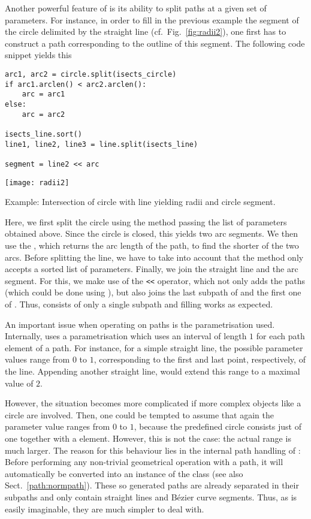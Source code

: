 Another powerful feature of \PyX{} is its ability to split paths at a
given set of parameters. For instance, in order to fill in the
previous example the segment of the circle delimited by the straight
line (cf.\ Fig.~\ref{fig:radii2}), one first has to construct a path
corresponding to the outline of this segment. The following code
snippet yields this 
\begin{verbatim}
arc1, arc2 = circle.split(isects_circle)
if arc1.arclen() < arc2.arclen():
    arc = arc1
else:
    arc = arc2

isects_line.sort()
line1, line2, line3 = line.split(isects_line)

segment = line2 << arc
\end{verbatim}
\texttt{[image: radii2]}
\centerline{Example: Intersection of circle with line yielding radii and
  circle segment.}
Here, we first split the circle using the  method passing
the list of parameters obtained above. Since the circle is closed,
this yields two arc segments. We then use the , which
returns the arc length of the path, to find the shorter of the two
arcs. Before splitting the line, we have to take into account that
the  method only accepts a sorted list of parameters.
Finally, we join the straight line and the arc segment. For
this, we make use of the \verb|<<| operator, which not only adds
the paths (which could be done using ), but also
joins the last subpath of  and the first one of
. Thus,  consists of only a single subpath
and filling works as expected.

An important issue when operating on paths is the parametrisation
used. Internally, \PyX{} uses a parametrisation which uses an interval
of length $1$ for each path element of a path. For instance, for a
simple straight line, the possible parameter values range from $0$ to
$1$, corresponding to the first and last point, respectively, of the
line. Appending another straight line, would extend this range to a
maximal value of $2$. 

However, the situation becomes more complicated if more complex
objects like a circle are involved. Then, one could be tempted to
assume that again the parameter value ranges from $0$ to $1$, because
the predefined circle consists just of one  together with a
 element. However, this is not the case: the actual
range is much larger. The reason for this behaviour lies in the
internal path handling of \PyX: Before performing any non-trivial
geometrical operation with a path, it will automatically be converted
into an instance of the  class (see also
Sect.~\ref{path:normpath}). These so generated paths are already
separated in their subpaths and only contain straight lines and
B\'ezier curve segments. Thus, as is easily imaginable, they are much
simpler to deal with.

